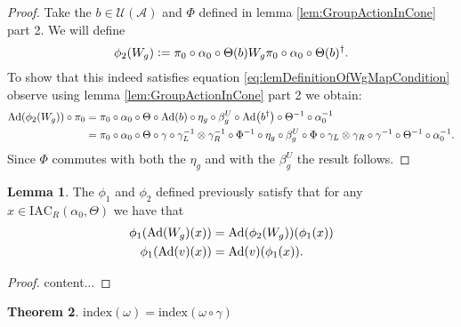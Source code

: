 \documentclass[12pt,a4paper,twoside]{article}
\newcommand{\defeq}{\vcentcolon=}
\let\originalleft\left
\let\originalright\right
\renewcommand{\left}{\mathopen{}\mathclose\bgroup\originalleft}
\renewcommand{\right}{\aftergroup\egroup\originalright}
\newcommand{\UU}{\mathcal U}
\renewcommand{\AA}{\mathcal A}
\newcommand{\Ad}[1]{\textrm{Ad}\left(#1\right)}
\theoremstyle{definition}
\newtheorem{theorem}{Theorem}[section]
\newtheorem{lemma}[theorem]{Lemma}
\numberwithin{equation}{section}
\begin{document}
\begin{proof}
	Take the $b\in\UU(\AA)$ and $\Phi$ defined in lemma \ref{lem:GroupActionInCone} part 2. We will define
	\begin{equation}
		\phi_2(W_g)\defeq \pi_0\circ\alpha_0\circ\Theta(b)W_g\pi_0\circ\alpha_0\circ\Theta(b)^\dagger.
	\end{equation}
	To show that this indeed satisfies equation \eqref{eq:lemDefinitionOfWgMapCondition} observe using lemma \ref{lem:GroupActionInCone} part 2 we obtain:
	\begin{align}
		\Ad{\phi_2(W_g)}\circ\pi_0&=\pi_0\circ \alpha_0\circ\Theta\circ\Ad{b}\circ\eta_g\circ\beta_g^U\circ\Ad{b^{\dagger}}\circ\Theta^{-1}\circ\alpha_0^{-1}\\
		&=\pi_0\circ \alpha_0\circ\Theta\circ\gamma\circ\gamma_L^{-1}\otimes\gamma_R^{-1}\circ\Phi^{-1}\circ\eta_g\circ\beta_g^U\circ\Phi\circ\gamma_L\otimes\gamma_R\circ\gamma^{-1}\circ\Theta^{-1}\circ\alpha_0^{-1}.
	\end{align}
	Since $\Phi$ commutes with both the $\eta_g$ and with the $\beta_g^U$ the result follows.
\end{proof}
\begin{lemma}
	The $\phi_1$ and $\phi_2$ defined previously satisfy that for any $x\in\textrm{IAC}_R(\alpha_0,\Theta)$ we have that
		\begin{align}
			\phi_1(\Ad{W_g}(x))&=\Ad{\phi_2(W_g)}(\phi_1(x))\\
			\phi_1(\Ad{v}(x))&=\Ad{v}(\phi_1(x)).
	\end{align}
\end{lemma}
\begin{proof}
	content...
\end{proof}
\begin{theorem}
	$\textrm{index}(\omega)=\textrm{index}(\omega\circ\gamma)$
\end{theorem}
\end{document}
